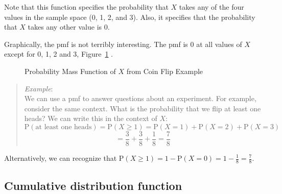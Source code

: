 \documentclass[
  letterpaper,
  DIV=11,
  numbers=noendperiod]{scrreprt}
\begin{document}
Note that this function specifies the probability that \(X\) takes any
of the four values in the sample space (0, 1, 2, and 3). Also, it
specifies that the probability that \(X\) takes any other value is 0.

Graphically, the pmf is not terribly interesting. The pmf is 0 at all
values of \(X\) except for 0, 1, 2 and 3, Figure~\ref{fig-pmf101} .

\begin{figure}


\caption{\label{fig-pmf101}Probability Mass Function of \(X\) from Coin
Flip Example}

\end{figure}%

\begin{quote}
\emph{Example}:\\
We can use a pmf to answer questions about an experiment. For example,
consider the same context. What is the probability that we flip at least
one heads? We can write this in the context of \(X\): \[
\mbox{P}(\mbox{at least one heads})=\mbox{P}(X\geq 1)=\mbox{P}(X=1)+\mbox{P}(X=2)+\mbox{P}(X=3)
\] \[=\frac{3}{8} + \frac{3}{8}+\frac{1}{8}=\frac{7}{8}
\]
\end{quote}

Alternatively, we can recognize that
\(\mbox{P}(X\geq 1)=1-\mbox{P}(X=0)=1-\frac{1}{8}=\frac{7}{8}\).

\subsection{Cumulative distribution
function}\label{cumulative-distribution-function}
\end{document}
